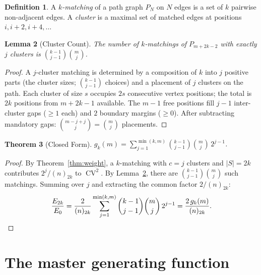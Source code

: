 \documentclass[11pt]{amsart}
\newtheorem{theorem}{Theorem}[section]
\newtheorem{lemma}[theorem]{Lemma}
\theoremstyle{definition}
\newtheorem{definition}[theorem]{Definition}
\DeclareMathOperator{\CV}{CV}
\begin{document}
\begin{definition}
A \emph{$k$-matching} of a path graph $P_N$ on $N$ edges is a set of $k$ pairwise non-adjacent edges. A \emph{cluster} is a maximal set of matched edges at positions $i, i+2, i+4, \ldots$
\end{definition}

\begin{lemma}[Cluster Count]\label{lem:cluster}
The number of $k$-matchings of $P_{m+2k-2}$ with exactly $j$ clusters is $\binom{k-1}{j-1}\binom{m}{j}$.
\end{lemma}

\begin{proof}
A $j$-cluster matching is determined by a composition of $k$ into $j$ positive parts (the cluster sizes; $\binom{k-1}{j-1}$ choices) and a placement of $j$ clusters on the path. Each cluster of size $s$ occupies $2s$ consecutive vertex positions; the total is $2k$ positions from $m + 2k - 1$ available. The $m - 1$ free positions fill $j - 1$ inter-cluster gaps ($\geq 1$ each) and $2$ boundary margins ($\geq 0$). After subtracting mandatory gaps: $\binom{m-j+j}{j} = \binom{m}{j}$ placements.
\end{proof}

\begin{theorem}[Closed Form]\label{thm:closed}
$g_k(m) = \sum_{j=1}^{\min(k,m)} \binom{k-1}{j-1}\binom{m}{j}\, 2^{j-1}$.
\end{theorem}

\begin{proof}
By Theorem~\ref{thm:weight}, a $k$-matching with $c = j$ clusters and $|S| = 2k$ contributes $2^j/(n)_{2k}$ to $\CV^2$. By Lemma~\ref{lem:cluster}, there are $\binom{k-1}{j-1}\binom{m}{j}$ such matchings. Summing over $j$ and extracting the common factor $2/(n)_{2k}$:
\[
\frac{E_{2k}}{E_0} = \frac{2}{(n)_{2k}} \sum_{j=1}^{\min(k,m)} \binom{k-1}{j-1}\binom{m}{j}\, 2^{j-1} = \frac{2\, g_k(m)}{(n)_{2k}}. \qedhere
\]
\end{proof}

\section{The master generating function}
\end{document}
